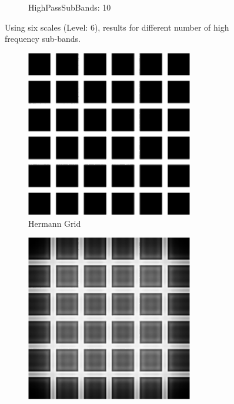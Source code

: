 \documentclass{InsightArticle}
\theoremstyle{definition}
\begin{document}
\begin{figure}[H]
\begin{subfigure}[t]{.333\textwidth}
    \captionsetup{width=\textwidth}
    \caption{HighPassSubBands: 10}
    \label{fig:phase_bands610}
  \end{subfigure}
  \caption{Using six scales (Level: 6), results for different number of high frequency sub-bands.}
  \label{fig:phase_bands}
\end{figure}
\begin{figure}[H]
  \centering
  \begin{subfigure}[t]{0.4\textwidth}
    \centering
    \includegraphics[width=0.8\textwidth]{phaseImages/hermann_original.png}
    \captionsetup{width=\textwidth}
    \caption{Hermann Grid}
    \label{fig:hermann_original}
  \end{subfigure}
  \vspace*{\floatsep}
  \begin{subfigure}[t]{.4\textwidth}
    \centering
    \includegraphics[width=0.8\textwidth]{phaseImages/hermann_simoncelli_8_1.png}

\end{subfigure}
\end{figure}
\end{document}
